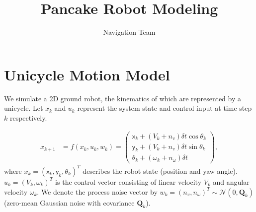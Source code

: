 \documentclass[]{article}
\title{Pancake Robot Modeling}
\author{Navigation Team}
\begin{document}
\maketitle

\section{Unicycle Motion Model}

We simulate a 2D ground robot, the kinematics of which are represented by a unicycle. Let $x_{k}$ and $ u_{k}$ represent the system state and  control input at time step $ k $ respectively.

\begin{align}\label{eq:unicycle-motion-model}
\!\!\!\!\!x_{k+1}& \!=\! f(x_k,u_k,w_k) \!=\!
\left(\!
\begin{array}{c}
\mathsf{x}_{k}+(V_k + n_v)\delta t\cos\theta_k \\
\mathsf{y}_{k}+(V_k + n_v)\delta t\sin\theta_k \\
\mathsf{\theta}_{k}+(\omega_k + n_{\omega})\delta t
\end{array}\!\right)\!,
\end{align}
where $ x_k = (\mathsf{x}_k, \mathsf{y}_k, \mathsf{\theta}_k)^T $ describes the robot state (position and yaw angle). $ u_k = (V_k,\omega_k)^T $ is the control vector consisting of linear velocity $ V_k $ and angular velocity $ \omega_k $. We denote the process noise vector by $ w_k=(n_v,n_{\omega})^T\sim\mathcal{N}(0,\mathbf{Q}_k) $ (zero-mean Gaussian noise with covariance $\mathbf{Q}_k$).
\end{document}
